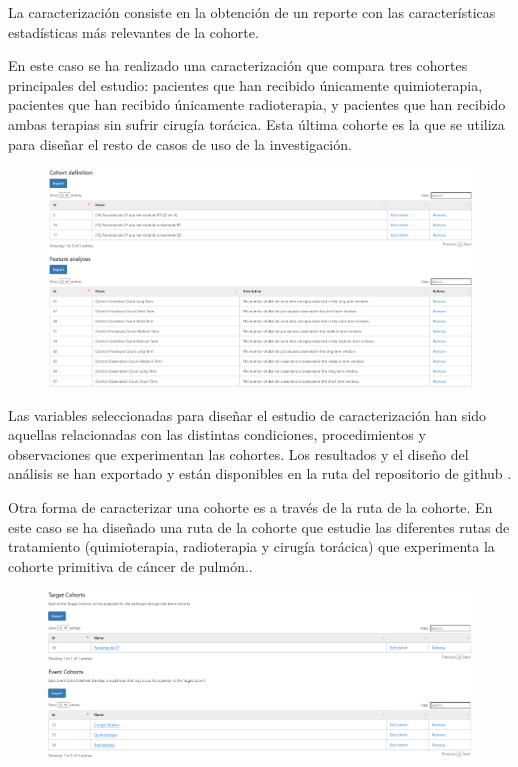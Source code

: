 La caracterización consiste en la obtención de un reporte con las características estadísticas más relevantes de la cohorte. 

En este caso se ha realizado una caracterización que compara tres cohortes principales del estudio: pacientes que han recibido únicamente quimioterapia, pacientes que han recibido únicamente radioterapia, y pacientes que han recibido ambas terapias sin sufrir cirugía torácica. Esta última cohorte es la que se utiliza para diseñar el resto de casos de uso de la investigación. 


\begin{figure}[H]
    \centering
    \includegraphics[width=1\textwidth]{tables/characterization_statistics.png}
    \label{table:characterization_statistics}
\end{figure}

Las variables seleccionadas para diseñar el estudio de caracterización han sido aquellas relacionadas con las distintas condiciones, procedimientos y observaciones que experimentan las cohortes.  Los resultados y el diseño del análisis se han exportado y están disponibles en la ruta del repositorio de github .

Otra forma de caracterizar una cohorte es a través de la ruta de la cohorte. En este caso se ha diseñado una ruta de la cohorte que estudie las diferentes rutas de tratamiento (quimioterapia, radioterapia y cirugía torácica) que experimenta la cohorte primitiva de cáncer de pulmón..

\begin{figure}[H]
    \centering
    \includegraphics[width=1\textwidth]{tables/pathway_definition.png}
    \label{table:pathway_definition}
\end{figure}

